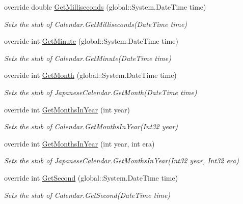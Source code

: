 \begin{DoxyCompactItemize}
override double \hyperlink{class_system_1_1_globalization_1_1_fakes_1_1_stub_japanese_calendar_a22b5ce3203cc7ab141a1d569d09ee3aa}{Get\-Milliseconds} (global\-::\-System.\-Date\-Time time)
\begin{DoxyCompactList}\small\item\em Sets the stub of Calendar.\-Get\-Milliseconds(\-Date\-Time time)\end{DoxyCompactList}\item 
override int \hyperlink{class_system_1_1_globalization_1_1_fakes_1_1_stub_japanese_calendar_a5b52f66b3f1efbb21bee479a6624f2a0}{Get\-Minute} (global\-::\-System.\-Date\-Time time)
\begin{DoxyCompactList}\small\item\em Sets the stub of Calendar.\-Get\-Minute(\-Date\-Time time)\end{DoxyCompactList}\item 
override int \hyperlink{class_system_1_1_globalization_1_1_fakes_1_1_stub_japanese_calendar_a38310f38dd3e6dee81ccd3f04abfa2bd}{Get\-Month} (global\-::\-System.\-Date\-Time time)
\begin{DoxyCompactList}\small\item\em Sets the stub of Japanese\-Calendar.\-Get\-Month(\-Date\-Time time)\end{DoxyCompactList}\item 
override int \hyperlink{class_system_1_1_globalization_1_1_fakes_1_1_stub_japanese_calendar_accd6af8458b54d1a8b384e91023ea295}{Get\-Months\-In\-Year} (int year)
\begin{DoxyCompactList}\small\item\em Sets the stub of Calendar.\-Get\-Months\-In\-Year(\-Int32 year)\end{DoxyCompactList}\item 
override int \hyperlink{class_system_1_1_globalization_1_1_fakes_1_1_stub_japanese_calendar_a0691fa2be56788269e3a71730d10ac18}{Get\-Months\-In\-Year} (int year, int era)
\begin{DoxyCompactList}\small\item\em Sets the stub of Japanese\-Calendar.\-Get\-Months\-In\-Year(\-Int32 year, Int32 era)\end{DoxyCompactList}\item 
override int \hyperlink{class_system_1_1_globalization_1_1_fakes_1_1_stub_japanese_calendar_af3f75e771244ea795189f3f9089ec7c8}{Get\-Second} (global\-::\-System.\-Date\-Time time)
\begin{DoxyCompactList}\small\item\em Sets the stub of Calendar.\-Get\-Second(\-Date\-Time time)\end{DoxyCompactList}\item 

\end{DoxyCompactItemize}
